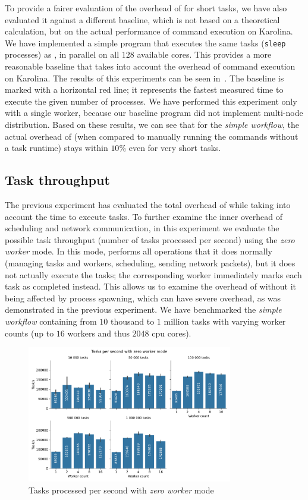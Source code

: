 To provide a fairer evaluation of the overhead of \hyperqueue{} for short tasks, we have
also evaluated it against a different baseline, which is not based on a theoretical calculation,
but on the actual performance of command execution on Karolina. We have implemented a simple
program that executes the same tasks (\texttt{sleep} processes) as
\hyperqueue{}, in parallel on all $128$ available cores. This provides a
more reasonable baseline that takes into account the overhead of command execution on Karolina. The
results of this experiments can be seen in~. The baseline is marked with a
horizontal red line; it represents the fastest measured time to execute the given number of
processes. We have performed this experiment only with a single worker, because our baseline
program did not implement multi-node distribution. Based on these results, we can see that for the
\emph{simple workflow}, the actual overhead of \hyperqueue{} (when compared to manually
running the commands without a task runtime) stays within $10\%$ even for very short tasks.

\subsection{Task throughput}
\label{sec:hq-exp-task-throughput}
The previous experiment has evaluated the total overhead of \hyperqueue{} while taking
into account the time to execute tasks. To further examine the inner overhead of scheduling and
network communication, in this experiment we evaluate the possible task throughput (number of tasks
processed per second) using the \emph{zero worker} mode. In this mode, \hq{}
performs all operations that it does normally (managing tasks and workers, scheduling, sending
network packets), but it does not actually execute the tasks; the corresponding worker immediately
marks each task as completed instead. This allows us to examine the overhead of
\hyperqueue{} without it being affected by process spawning, which can have severe
overhead, as was demonstrated in the previous experiment. We have benchmarked the
\emph{simple workflow} containing from $10$ thousand to $1$
million tasks with varying worker counts (up to $16$ workers and thus
$2048$ \gls{cpu} cores).

\begin{figure}[h]
	\centering
	\includegraphics[width=0.8\textwidth]{imgs/hq/charts/task-per-s}
	\caption{Tasks processed per second with \emph{zero worker} mode}
	\label{fig:hq-tasks-per-s}
\end{figure}


